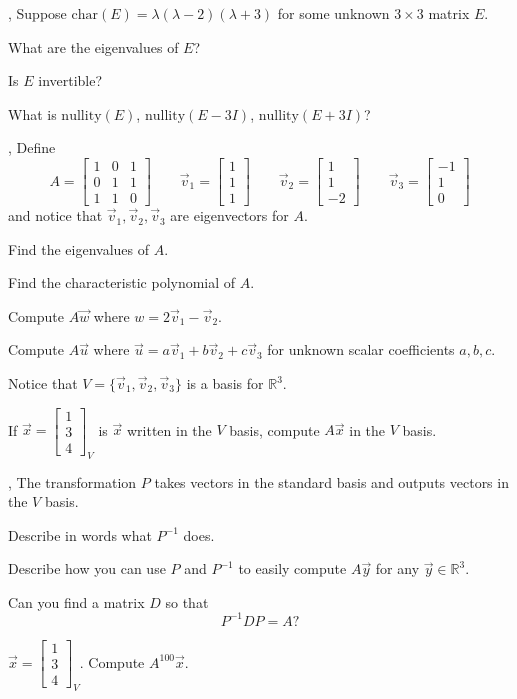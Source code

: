 \documentclass[letter]{article}
\newcommand{\R}{\mathbb{R}}
\newcommand{\nnul}{\mathrm{nullity}}
\newcommand{\mat}[1]{\begin{bmatrix}#1\end{bmatrix}}
\newcommand{\chr}{\mathrm{char}}
\begin{document}
	\sep
	Suppose $\chr(E)=\lambda(\lambda -2)(\lambda +3)$ for some unknown $3\times 3$
	matrix $E$.
	\begin{Enum}
		\item What are the eigenvalues of $E$?
		\item Is $E$ invertible?
		\item What is $\nnul(E)$, $\nnul(E-3I)$, $\nnul(E+3I)$?
	\end{Enum}

	\sep
	Define
	\[
		A=\mat{1&0&1\\0&1&1\\1&1&0}\qquad
		\vec v_1=\mat{1\\1\\1}\qquad
		\vec v_2=\mat{1\\1\\-2}\qquad
		\vec v_3=\mat{-1\\1\\0}
	\]
	and notice that $\vec v_1,\vec v_2,\vec v_3$ are eigenvectors for $A$.
	\begin{Enum}
		\item Find the eigenvalues of $A$.
		\item Find the characteristic polynomial of $A$.
		\item Compute $A\vec w$ where $w=2\vec v_1-\vec v_2$.
		\item Compute $A\vec u$ where $\vec u=a\vec v_1+b\vec v_2+c\vec v_3$ for
			unknown scalar coefficients $a,b,c$.
	\end{Enum}
	Notice that $V=\{\vec v_1,\vec v_2,\vec v_3\}$ is a basis for $\R^3$.
	\begin{Enum}[resume]
	\item If $\vec x=\mat{1\\3\\4}_V$ is $\vec x$ written in the $V$ basis,
		compute $A\vec x$ in the $V$ basis.
	\end{Enum}
	
	\sep
	The transformation $P$ takes vectors in the standard basis and outputs
	vectors in the $V$ basis.  
	\begin{Enum}
		\item Describe in words what $P^{-1}$ does.
		\item Describe how you can use $P$ and $P^{-1}$ to easily compute
			$A\vec y$ for any $\vec y\in \R^3$.
		\item Can you find a matrix $D$ so that
			\[
				P^{-1}DP=A?
			\]
		\item $\vec x=\mat{1\\3\\4}_V$.  Compute $A^{100}\vec x$.
	\end{Enum}
\end{document}
